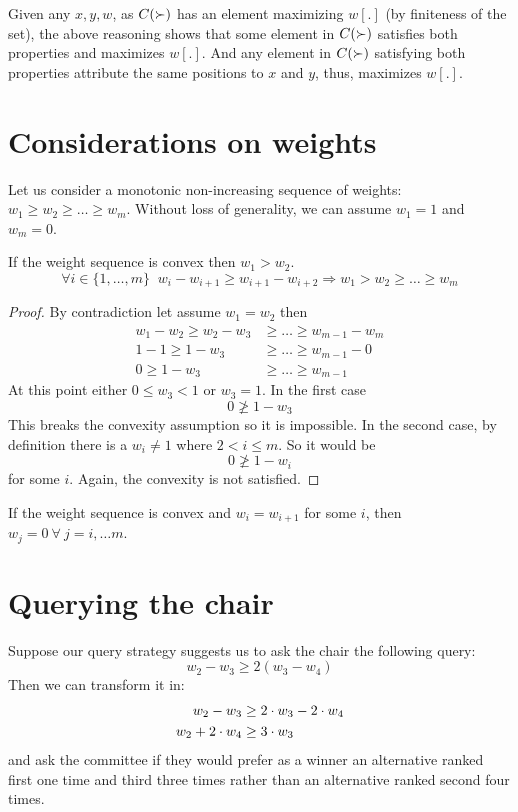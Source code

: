 Given any $x, y, w$, as $C(\succ)$ has an element maximizing $w[.]$ (by finiteness of the set), the above reasoning shows that some element in $C(\succ)$ satisfies both properties and maximizes $w[.]$. And any element in $C(\succ)$ satisfying both properties attribute the same positions to $x$ and $y$, thus, maximizes $w[.]$.

\section{Considerations on weights}
\label{sec:weights}
Let us consider a monotonic non-increasing sequence of weights: $w_{1} \geq w_{2} \geq \ldots \geq w_{m}$. Without loss of generality, we can assume $w_1=1$ and $w_m=0$.

\begin{claim}
	\label{clm:wsequence}
	If the weight sequence is convex then $w_{1} > w_{2}$.
	\[\forall i \in \{1,\ldots,m\} \;\; w_i - w_{i+1} \geq w_{i+1}-w_{i+2} \Rightarrow w_{1} > w_{2} \geq \ldots \geq w_{m}\] 
\end{claim}
\begin{proof}
	By contradiction let assume $w_{1} = w_{2}$ then 
	\begin{align*}
	w_{1} - w_{2} \geq w_{2} - w_{3} &\geq \dots \geq w_{m-1} - w_{m} \\
	1 - 1 \geq 1 - w_{3} &\geq \dots \geq w_{m-1} - 0 \\
	0 \geq 1 - w_{3} &\geq \dots \geq w_{m-1}
	\end{align*}
	At this point either $0\leq w_{3}<1$ or $w_{3}=1$. In the first case 
	\[0 \ngeq 1 - w_{3}\]
	This breaks the convexity assumption so it is impossible.
	In the second case, by definition there is a $w_{i} \neq 1$ where $2 < i \leq m$. So it would be 
	\[0 \ngeq 1 - w_{i}\]
	for some $i$. Again, the convexity is not satisfied.
\end{proof}

\begin{corollary}
	\label{cor:weq}
	If the weight sequence is convex and $w_{i} = w_{i+1}$ for some $i$, then $w_{j}=0 \ \forall \
	j=i, \dots m$.
\end{corollary}


\section{Querying the chair}
Suppose our query strategy suggests us to ask the chair the following query:
\[ w_{2} - w_{3} \geq 2(w_{3} - w_{4}) \]
Then we can transform it in:
\begin{align}
\label{eqn:juryquery}
w_{2} - w_{3} &\geq 2 \cdot w_{3} - 2 \cdot w_{4} \notag \\
w_{2} + 2 \cdot w_{4} &\geq 3 \cdot w_{3} 
\end{align}
and ask the committee if they would prefer as a winner an alternative ranked first one time and third three times rather than an alternative ranked second four times.

